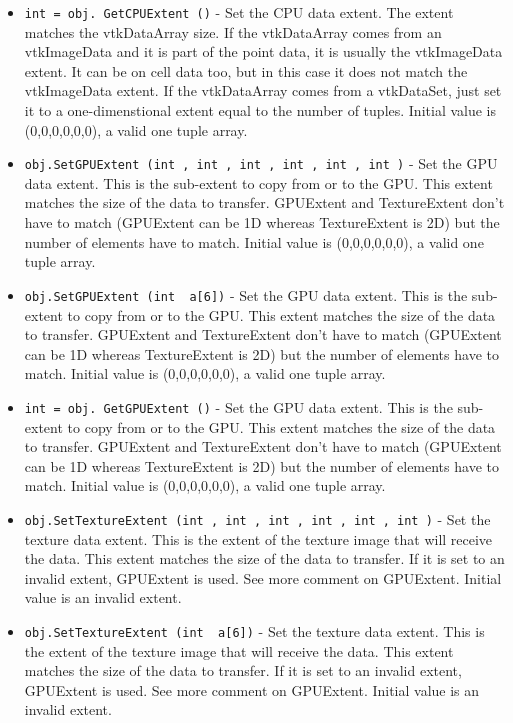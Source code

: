 \begin{itemize}
\item  \verb|int = obj. GetCPUExtent ()| -  Set the CPU data extent. The extent matches the vtkDataArray size.
 If the vtkDataArray comes from an vtkImageData and it is part of the
 point data, it is usually the vtkImageData extent.
 It can be on cell data too, but in this case it does not match the
 vtkImageData extent.
 If the vtkDataArray comes from a vtkDataSet, just
 set it to a one-dimenstional extent equal to the number of tuples.
 Initial value is (0,0,0,0,0,0), a valid one tuple array.

\item  \verb|obj.SetGPUExtent (int , int , int , int , int , int )| -  Set the GPU data extent. This is the sub-extent to copy from or to the GPU.
 This extent matches the size of the data to transfer.
 GPUExtent and TextureExtent don't have to match (GPUExtent can be 1D
 whereas TextureExtent is 2D) but the number of elements have to match.
 Initial value is (0,0,0,0,0,0), a valid one tuple array.

\item  \verb|obj.SetGPUExtent (int  a[6])| -  Set the GPU data extent. This is the sub-extent to copy from or to the GPU.
 This extent matches the size of the data to transfer.
 GPUExtent and TextureExtent don't have to match (GPUExtent can be 1D
 whereas TextureExtent is 2D) but the number of elements have to match.
 Initial value is (0,0,0,0,0,0), a valid one tuple array.

\item  \verb|int = obj. GetGPUExtent ()| -  Set the GPU data extent. This is the sub-extent to copy from or to the GPU.
 This extent matches the size of the data to transfer.
 GPUExtent and TextureExtent don't have to match (GPUExtent can be 1D
 whereas TextureExtent is 2D) but the number of elements have to match.
 Initial value is (0,0,0,0,0,0), a valid one tuple array.

\item  \verb|obj.SetTextureExtent (int , int , int , int , int , int )| -  Set the texture data extent. This is the extent of the texture image that
 will receive the data. This extent matches the size of the data to
 transfer. If it is set to an invalid extent, GPUExtent is used.
 See more comment on GPUExtent.
 Initial value is an invalid extent.

\item  \verb|obj.SetTextureExtent (int  a[6])| -  Set the texture data extent. This is the extent of the texture image that
 will receive the data. This extent matches the size of the data to
 transfer. If it is set to an invalid extent, GPUExtent is used.
 See more comment on GPUExtent.
 Initial value is an invalid extent.


\end{itemize}
